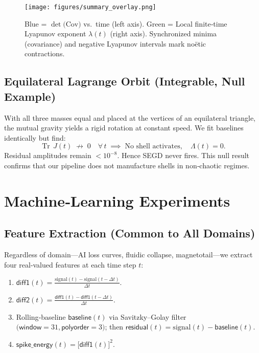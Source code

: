 \documentclass[11pt]{article}
\newcommand{\Leak}{\Lambda}
\newcommand{\TrJ}{\operatorname{Tr}\,J}
\begin{document}
\begin{figure}[H]
  \centering
  \texttt{[image: figures/summary\_overlay.png]}
  \caption{%
    Blue = \(\det\bigl(\mathrm{Cov}\bigr)\) vs.\ time (left axis).  
    Green = Local finite‐time Lyapunov exponent \(\lambda(t)\) (right axis).  
    Synchronized minima (covariance) and negative Lyapunov intervals mark noëtic contractions.}
  \label{fig:summary_overlay}
\end{figure}

\subsection{Equilateral Lagrange Orbit (Integrable, Null Example)}\label{sec:lagrange_null}
With all three masses equal and placed at the vertices of an equilateral triangle, the mutual gravity yields a rigid rotation at constant speed. We fit baselines identically but find:
\[
  \TrJ(t) \;\not\to\; 0 \quad \forall\,t 
  \;\implies\; \text{No shell activates}, 
  \quad \Leak(t) = 0.
\]
Residual amplitudes remain \(<10^{-8}\). Hence SEGD never fires. This null result confirms that our pipeline does not manufacture shells in non‐chaotic regimes.

\section{Machine‐Learning Experiments}

\subsection{Feature Extraction (Common to All Domains)}
Regardless of domain—AI loss curves, fluidic collapse, magnetotail—we extract four real‐valued features at each time step \(t\):
\begin{enumerate}[itemsep=2pt]
  \item \(\displaystyle \mathsf{diff1}(t) = \frac{\mathrm{signal}(t) - \mathrm{signal}(t-\Delta t)}{\Delta t}.\)
  \item \(\displaystyle \mathsf{diff2}(t) = \frac{\mathsf{diff1}(t) - \mathsf{diff1}(t-\Delta t)}{\Delta t}.\)
  \item Rolling‐baseline \(\mathsf{baseline}(t)\) via Savitzky–Golay filter \(\bigl(\mathsf{window}=31,\mathsf{polyorder}=3\bigr)\); then  
    \(\mathsf{residual}(t) = \mathrm{signal}(t) - \mathsf{baseline}(t).\)
  \item \(\displaystyle \mathsf{spike\_energy}(t) = \bigl[\mathsf{diff1}(t)\bigr]^2.\)
\end{enumerate}
\end{document}
